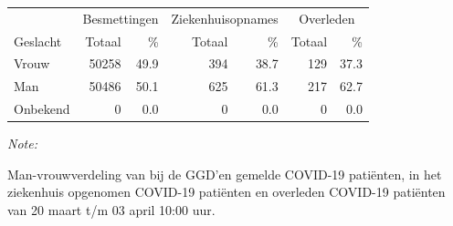 \documentclass[
  english,
  man,floatsintext]{apa6}
\begin{document}
\begin{table}
\centering\begingroup\fontsize{11}{13}\selectfont

\begin{threeparttable}
\begin{tabular}{lrrrrrr}
\toprule
\multicolumn{1}{c}{ } & \multicolumn{2}{c}{Besmettingen} & \multicolumn{2}{c}{Ziekenhuisopnames} & \multicolumn{2}{c}{Overleden} \\
\cmidrule(l{3pt}r{3pt}){2-3} \cmidrule(l{3pt}r{3pt}){4-5} \cmidrule(l{3pt}r{3pt}){6-7}
Geslacht & Totaal & \% & Totaal & \% & Totaal & \%\\
\midrule
Vrouw & 50258 & 49.9 & 394 & 38.7 & 129 & 37.3\\
Man & 50486 & 50.1 & 625 & 61.3 & 217 & 62.7\\
Onbekend & 0 & 0.0 & 0 & 0.0 & 0 & 0.0\\
\bottomrule
\end{tabular}
\begin{tablenotes}
\item \textit{Note: } 
\item Man-vrouwverdeling van bij de GGD’en gemelde COVID-19 patiënten, in het ziekenhuis opgenomen COVID-19 patiënten en overleden COVID-19 patiënten van 20 maart t/m 03 april 10:00 uur.
\end{tablenotes}
\end{threeparttable}
\endgroup{}
\end{table}
\newpage
\end{document}
